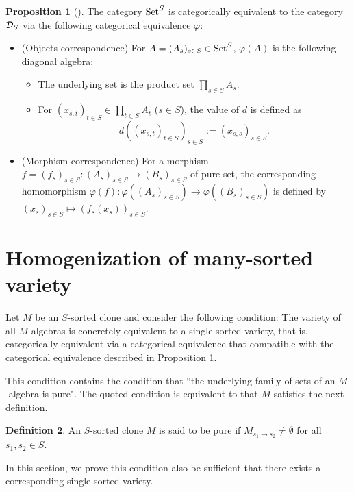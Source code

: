 \documentclass[a4paper,10pt]{article}
\theoremstyle{definition}
\newtheorem{df}{Definition}[section]
\newtheorem{prop}[df]{Proposition}
\newcommand\ph{\varphi}
\newcommand\ra{\rightarrow}
\newcommand\Set{{\textbf{{\rm Set}}}}
\begin{document}
\begin{prop}[{\cite[Theorem 3.4]{MRS}}]\label{pureset-and-sets}
The category $\Set^S$ is categorically equivalent to the category ${\cal D}_S$
via the following categorical equivalence $\ph$:
\begin{itemize}
\item
(Objects correspondence) For $A=(A_s)_{s\in S}\in \Set^S$, 
$\ph(A)$ is the following diagonal algebra:
\begin{itemize}
\item
The underlying set is the product set $\prod_{s\in S}A_s$.
\item
For $(x_{s,t})_{t\in S}\in \prod_{t\in S}A_t$ ($s\in S$), the value
of $d$ is defined as
\[
d((x_{s,t})_{t\in S})_{s\in S}:=(x_{s,s})_{s\in S}.
\]
\end{itemize}
\item
(Morphism correspondence)
For a morphism $f=(f_s)_{s\in S}:(A_s)_{s\in S}\ra (B_s)_{s\in S}$ of pure set,
the corresponding homomorphism $\ph(f):\ph((A_s)_{s\in S})\ra \ph((B_s)_{s\in S})$
is defined by $(x_s)_{s\in S}\mapsto (f_s(x_s))_{s\in S}$.
\end{itemize}
\end{prop}

\section{Homogenization of many-sorted variety} \label{s-homogenization-of-many-sorted-variety}

Let $M$ be an $S$-sorted clone and consider the following condition:
The variety of all $M$-algebras is concretely equivalent to a
single-sorted variety, that is, categorically equivalent
via a categorical equivalence that compatible with the categorical equivalence
described in Proposition \ref{pureset-and-sets}.

This condition contains the condition that ``the underlying family of sets of
an $M$-algebra is pure".
The quoted condition is equivalent to that $M$ satisfies the next definition.

\begin{df}\label{pure-clone}
An $S$-sorted clone $M$ is said to be pure if 
$M_{s_1\ra s_2}\neq \emptyset$ for all $s_1,s_2\in S$.
\end{df}

In this section, we prove this condition also be sufficient
that there exists a corresponding single-sorted variety.
\end{document}
